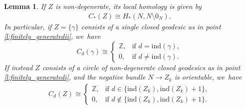 \documentclass[JEP,XML,SOM,Unicode,NoFloatCountersInSection,published]{cedram}
\newcommand{\Z}{\mathbb{Z}}
\newcommand{\ind}{\mathrm{ind}}
\theoremstyle{plain}
\newtheorem{Lemma}[Thm]{Lemma}
\theoremstyle{definition}
\begin{document}
\begin{Lemma}\label{l:non_deg_visible}
If $Z$ is non-degenerate, its local homology is given by
\begin{align*}
C_*(Z)\cong H_*(N,N\setminus0_N).
\end{align*}
In particular, if $Z=\{\gamma\}$ consists of a single closed geodesic as in point \eqref{l:finitely_generatedii}, we~have
\[
C_d(\gamma)
\cong
\begin{cases}
\Z, & \mbox{if } d=\ind(\gamma), \\
0, & \mbox{if } d\neq\ind(\gamma).
\end{cases}
\]
If instead $Z$ consists of a circle of non-degenerate closed geodesics as in point \eqref{l:finitely_generatedi}, and the negative bundle $N\to Z_k$ is orientable, we~have
\begin{align}
\label{e:loc_hom_circle}
C_d(Z)
\cong
\begin{cases}
\Z, & \mbox{if } d\in\{\ind(Z_k),\ind(Z_k)+1\}, \\
0, & \mbox{if }d\not\in\{\ind(Z_k),\ind(Z_k)+1\}.
\end{cases}
\end{align}
\end{Lemma}
\end{document}
